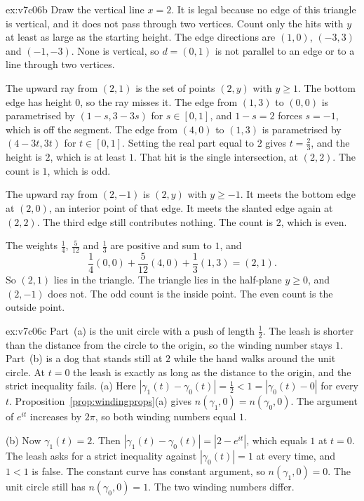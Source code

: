 \begin{solution}{ex:v7c06b}
\idea Draw the vertical line $x=2$. It is legal because no edge of this triangle is vertical, and it does not pass through two vertices. Count only the hits with $y$ at least as large as the starting height.
\writeup The edge directions are $(1,0)$, $(-3,3)$ and $(-1,-3)$. None is vertical, so $d=(0,1)$ is not parallel to an edge or to a line through two vertices.

The upward ray from $(2,1)$ is the set of points $(2,y)$ with $y\ge1$. The bottom edge has height $0$, so the ray misses it. The edge from $(1,3)$ to $(0,0)$ is parametrised by $(1-s,3-3s)$ for $s\in[0,1]$, and $1-s=2$ forces $s=-1$, which is off the segment. The edge from $(4,0)$ to $(1,3)$ is parametrised by $(4-3t,3t)$ for $t\in[0,1]$. Setting the real part equal to $2$ gives $t=\frac23$, and the height is $2$, which is at least $1$. That hit is the single intersection, at $(2,2)$. The count is $1$, which is odd.

The upward ray from $(2,-1)$ is $(2,y)$ with $y\ge-1$. It meets the bottom edge at $(2,0)$, an interior point of that edge. It meets the slanted edge again at $(2,2)$. The third edge still contributes nothing. The count is $2$, which is even.

The weights $\frac14$, $\frac{5}{12}$ and $\frac13$ are positive and sum to $1$, and
\[
\frac14(0,0)+\frac{5}{12}(4,0)+\frac13(1,3)=(2,1).
\]
So $(2,1)$ lies in the triangle. The triangle lies in the half-plane $y\ge0$, and $(2,-1)$ does not. The odd count is the inside point. The even count is the outside point.
\end{solution}

\begin{solution}{ex:v7c06c}
\idea Part~(a) is the unit circle with a push of length $\frac12$. The leash is shorter than the distance from the circle to the origin, so the winding number stays $1$. Part~(b) is a dog that stands still at $2$ while the hand walks around the unit circle. At $t=0$ the leash is exactly as long as the distance to the origin, and the strict inequality fails.
\writeup (a) Here $|\gamma_1(t)-\gamma_0(t)|=\frac12<1=|\gamma_0(t)-0|$ for every $t$. Proposition~\ref{prop:windingprops}(a) gives $n(\gamma_1,0)=n(\gamma_0,0)$. The argument of $e^{it}$ increases by $2\pi$, so both winding numbers equal $1$.

(b) Now $\gamma_1(t)=2$. Then $|\gamma_1(t)-\gamma_0(t)|=|2-e^{it}|$, which equals $1$ at $t=0$. The leash asks for a strict inequality against $|\gamma_0(t)|=1$ at every time, and $1<1$ is false. The constant curve has constant argument, so $n(\gamma_1,0)=0$. The unit circle still has $n(\gamma_0,0)=1$. The two winding numbers differ.
\end{solution}

